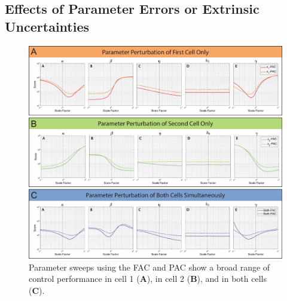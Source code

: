 \documentclass[12pt]{article}
\begin{document}
\subsection{Effects of Parameter Errors or Extrinsic Uncertainties}
\begin{figure}
\begin{center}
\includegraphics[width=1\textwidth]{ParameterPerturbation.pdf}
\caption{Parameter sweeps using the FAC and PAC show a broad range of control performance in cell 1 ({\bf A}),  in cell 2 ({\bf B}), and in both cells ({\bf C}). }
\label{Parameter}
\end{center}
\end{figure}
\end{document}
